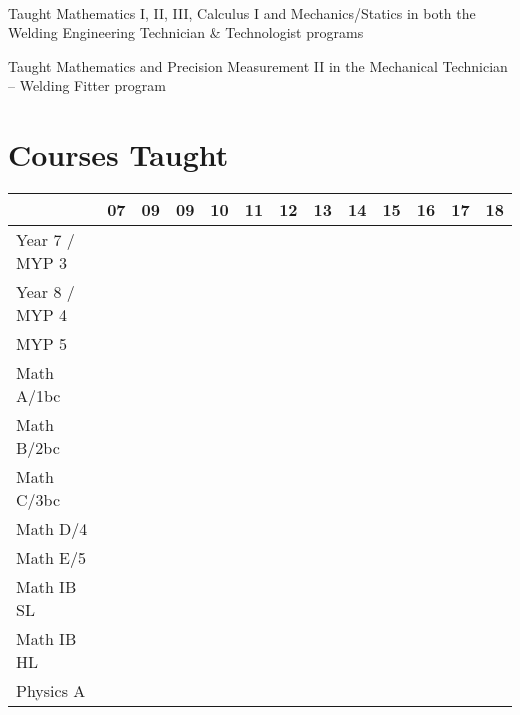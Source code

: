 \documentclass[a4paper]{deedy-resume}
\newcommand{\cvblue}[1]{{\color{cvblue}{#1}}}
\newcommand{\doneit}{\cvblue{$\odot$}}
\begin{document}
\begin{minipage}[t]{0.66\textwidth}
\\
\begin{tightemize}
\item Taught Mathematics I, II, III, Calculus I and Mechanics/Statics in both the Welding Engineering Technician \& Technologist programs
\item Taught Mathematics and Precision Measurement II in the Mechanical Technician -- Welding Fitter program \end{tightemize}
\sectionsep



\section{Courses Taught} 
\begin{center}
\begin{tabular}{l|cccccccccccc}
\cline{2-13}
& \textbf{07}& \textbf{09} & \textbf{09} & \textbf{10}& \textbf{11} & \textbf{12} & \textbf{13} & \textbf{14} & \textbf{15} & \textbf{16} & \textbf{17} & \textbf{18}\\
\hline

Year 7 / MYP 3 & \doneit & \doneit & &  &  &  &  &  & \doneit & \doneit & & \\

Year 8 / MYP 4 & & \doneit & &  &  &  &  &  & \doneit & \doneit& & \\

MYP 5 & & & &  &  &  & \doneit & \doneit & & & \doneit & \\

Math A/1bc & & & \doneit & \doneit & \doneit & \doneit & \doneit & \doneit & & \doneit & & \doneit\\

Math B/2bc & & & \doneit & \doneit & \doneit & \doneit & \doneit & \doneit & \doneit & \doneit & \doneit & \doneit\\

Math C/3bc & & & \doneit & \doneit & \doneit & \doneit & \doneit & & & & \doneit & \doneit\\

Math D/4 & & & \doneit & \doneit & \doneit & \doneit & \doneit & & & & & \\

Math E/5 & & &  &  & \doneit & \doneit & \doneit & & & & & \\

Math IB SL & & &  &  &  & &  & \doneit & \doneit & \doneit & \doneit & \doneit\\

Math IB HL & & &  &  &  & &  &  & & \doneit & & \doneit\\

Physics A & & &  &  & \doneit &  &  & & & & & \\

\end{tabular}
\end{center}
\sectionsep

\end{minipage} 
\end{document}
